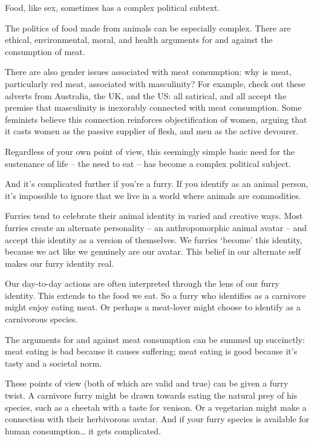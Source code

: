 
Food, like sex, sometimes has a complex political subtext.

The politics of food made from animals can be especially complex. There are ethical, environmental, moral, and health arguments for and against the consumption of meat.

There are also gender issues associated with meat consumption: why is meat, particularly red meat, associated with masculinity? For example, check out these adverts from Australia, the UK, and the US: all satirical, and all accept the premise that masculinity is inexorably connected with meat consumption. Some feminists believe this connection reinforces objectification of women, arguing that it casts women as the passive supplier of flesh, and men as the active devourer.

Regardless of your own point of view, this seemingly simple basic need for the sustenance of life – the need to eat – has become a complex political subject.

And it's complicated further if you're a furry. If you identify as an animal person, it's impossible to ignore that we live in a world where animals are commodities.

Furries tend to celebrate their animal identity in varied and creative ways. Most furries create an alternate personality – an anthropomorphic animal avatar – and accept this identity as a version of themselves. We furries `become' this identity, because we act like we genuinely are our avatar. This belief in our alternate self makes our furry identity real.

Our day-to-day actions are often interpreted through the lens of our furry identity. This extends to the food we eat. So a furry who identifies as a carnivore might enjoy eating meat. Or perhaps a meat-lover might choose to identify as a carnivorous species.

The arguments for and against meat consumption can be summed up succinctly: meat eating is bad because it causes suffering; meat eating is good because it's tasty and a societal norm.

These points of view (both of which are valid and true) can be given a furry twist. A carnivore furry might be drawn towards eating the natural prey of his species, such as a cheetah with a taste for venison. Or a vegetarian might make a connection with their herbivorous avatar. And if your furry species is available for human consumption… it gets complicated.

